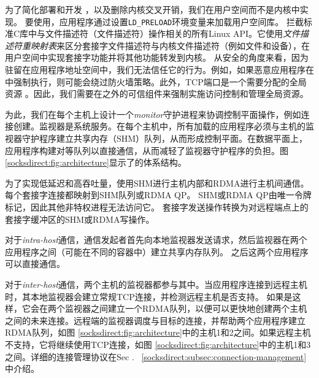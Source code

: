 
为了简化部署和开发 \cite {andromeda}，以及删除内核交叉开销，我们在用户空间而不是内核中实现\sys。
要使用\sys，应用程序通过设置\texttt {LD\_PRELOAD}环境变量来加载用户空间库\libipc {}。 \libipc {}拦截标准C库中与文件描述符（文件描述符）操作相关的所有Linux API。它使用\emph {文件描述符重映射表}来区分套接字文件描述符与内核文件描述符（例如文件和设备），在用户空间中实现套接字功能并将其他功能转发到内核。
从安全的角度来看，因为\libipc {}驻留在应用程序地址空间中，我们无法信任它的行为。例如，如果恶意应用程序在\libipc {}中强制执行，则可能会绕过防火墙策略。此外，TCP端口是一个需要分配的全局资源 \cite {lin2016scalable,nsdi19freeflow}。因此，我们需要在\libipc {}之外的可信组件来强制实施访问控制和管理全局资源。

为此，我们在每个主机上设计一个\emph {monitor}守护进程来协调控制平面操作，例如连接创建。监视器是系统服务。在每个主机中，所有加载\libipc {}的应用程序必须与主机的监视器守护程序建立共享内存（SHM）队列，从而形成控制平面。在数据平面上，应用程序构建对等队列以直接通信，从而减轻了监视器守护程序的负担。图 \ref {socksdirect:fig:architecture}显示了\sys {}的体系结构。



为了实现低延迟和高吞吐量，\sys {}使用SHM进行主机内部和RDMA进行主机间通信。
每个套接字连接都映射到SHM队列或RDMA QP。
SHM或RDMA QP由唯一令牌标记，因此其他非特权进程无法访问它。
套接字发送操作转换为对远程端点上的套接字缓冲区的SHM或RDMA写操作。

对于\emph {intra-host}通信，通信发起者首先向本地监视器发送请求，然后监视器在两个应用程序之间（可能在不同的容器中）建立共享内存队列。 之后这两个应用程序可以直接通信。



对于\emph {inter-host}通信，两个主机的监视器都参与其中。当应用程序连接到远程主机时，其本地监视器会建立常规TCP连接，并检测远程主机是否支持\sys {}。
如果是这样，它会在两个监视器之间建立一个RDMA队列，以便可以更快地创建两个主机之间的未来连接。远程端的监视器调度与目标的连接，并帮助两个应用程序建立RDMA队列，如图 \ref {socksdirect:fig:architecture}中的主机1和2之间。如果远程主机不支持\sys {}，它将继续使用TCP连接，如图 \ref {socksdirect:fig:architecture}中的主机1和3之间。详细的连接管理协议在Sec .~ \ref {socksdirect:subsec:connection-management}中介绍。

